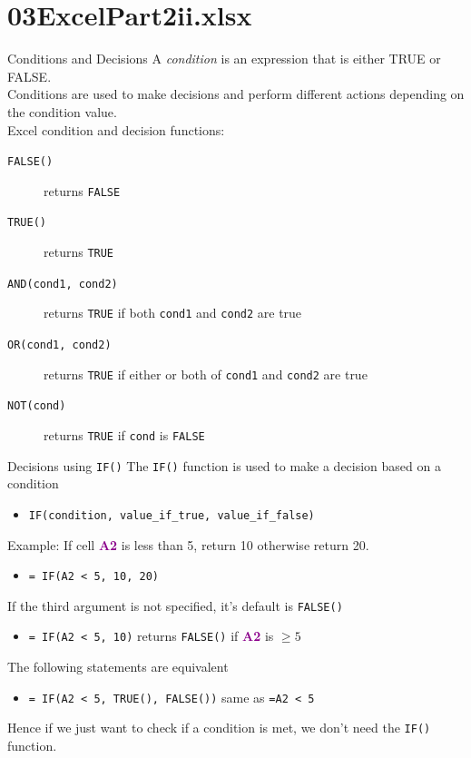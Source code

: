 \documentclass[xcolor=svgnames, handout]{beamer}
\newcommand{\cell}[1]{{\sf \textbf{\textcolor{DarkMagenta}{#1}}}}
\begin{document}
\section
  {03ExcelPart2ii.xlsx}


\begin{frame}{Conditions and Decisions}
A \emph{condition} is an expression that is either TRUE or FALSE.\\[1em]
Conditions are used to make decisions and perform different actions depending on the condition value.\\[1em]

Excel condition and decision functions:
\begin{description}
\item[{\tt FALSE()}]  returns {\tt FALSE}
\item[{\tt TRUE()}] returns {\tt TRUE}
\item[{\tt AND(cond1, cond2)}] returns {\tt TRUE} if both {\tt cond1} and {\tt cond2} are true
\item[{\tt OR(cond1, cond2)}] returns {\tt TRUE} if either or both of {\tt cond1} and {\tt cond2} are true
\item[{\tt NOT(cond)}] returns {\tt TRUE} if {\tt cond} is {\tt FALSE}
\end{description}
\end{frame}

\begin{frame}[fragile]{Decisions using {\tt IF()}}
 The {\tt IF()} function is used to make a decision based on a condition
\begin{itemize}
\item \verb|IF(condition, value_if_true, value_if_false)|
\end{itemize}
\medskip
 Example: If cell \cell{A2} is less than 5, return 10 otherwise return 20.
\begin{itemize}
\item \verb|= IF(A2 < 5, 10, 20)|
\end{itemize}
\medskip
If the third argument is not specified, it's default  is {\tt FALSE()}
\begin{itemize}
\item \verb|= IF(A2 < 5, 10)| returns {\tt FALSE()} if \cell{A2} is $\geq 5$
\end{itemize}
\medskip
The following statements are equivalent
\begin{itemize}
\item \verb|= IF(A2 < 5, TRUE(), FALSE())| same as \verb|=A2 < 5|
\end{itemize}
Hence if we just want to check if a condition is met, we don't need the {\tt IF()} function.

\end{frame}
\end{document}
